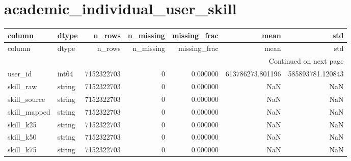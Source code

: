 \documentclass{article}
\begin{document}
\section*{academic_individual_user_skill}
\begin{longtable}{llrrrrr}
\toprule
column & dtype & n_rows & n_missing & missing_frac & mean & std \\
\midrule
\endfirsthead
\toprule
column & dtype & n_rows & n_missing & missing_frac & mean & std \\
\midrule
\endhead
\midrule
\multicolumn{7}{r}{Continued on next page} \\
\midrule
\endfoot
\bottomrule
\endlastfoot
user_id & int64 & 7152322703 & 0 & 0.000000 & 613786273.801196 & 585893781.120843 \\
skill_raw & string & 7152322703 & 0 & 0.000000 & NaN & NaN \\
skill_source & string & 7152322703 & 0 & 0.000000 & NaN & NaN \\
skill_mapped & string & 7152322703 & 0 & 0.000000 & NaN & NaN \\
skill_k25 & string & 7152322703 & 0 & 0.000000 & NaN & NaN \\
skill_k50 & string & 7152322703 & 0 & 0.000000 & NaN & NaN \\
skill_k75 & string & 7152322703 & 0 & 0.000000 & NaN & NaN \\
\end{longtable}
\end{document}
